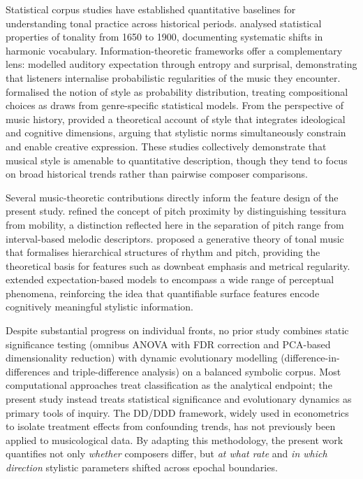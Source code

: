 \documentclass[]{interact}
\theoremstyle{plain}
\theoremstyle{definition}
\theoremstyle{remark}
\begin{document}
Statistical corpus studies have established quantitative baselines for understanding
tonal practice across historical periods. \citet{White2013} analysed statistical
properties of tonality from 1650 to 1900, documenting systematic shifts in harmonic
vocabulary. Information-theoretic frameworks offer a complementary lens:
\citet{PearceWiggins2012} modelled auditory expectation through entropy and
surprisal, demonstrating that listeners internalise probabilistic regularities
of the music they encounter. \citet{Temperley2007} formalised the notion of style
as probability distribution, treating compositional choices as draws from
genre-specific statistical models. From the perspective of music history,
\citet{Meyer1989} provided a theoretical account of style that integrates
ideological and cognitive dimensions, arguing that stylistic norms simultaneously
constrain and enable creative expression. These studies collectively demonstrate
that musical style is amenable to quantitative description, though they tend to
focus on broad historical trends rather than pairwise composer comparisons.

Several music-theoretic contributions directly inform the feature design of the
present study. \citet{VonHippel2000} refined the concept of pitch proximity by
distinguishing tessitura from mobility, a distinction reflected here in the
separation of pitch range from interval-based melodic descriptors.
\citet{LerdahlJackendoff1983} proposed a generative theory of tonal music that
formalises hierarchical structures of rhythm and pitch, providing the theoretical
basis for features such as downbeat emphasis and metrical regularity.
\citet{Huron2006} extended expectation-based models to encompass a wide range
of perceptual phenomena, reinforcing the idea that quantifiable surface features
encode cognitively meaningful stylistic information.

Despite substantial progress on individual fronts, no prior study combines static
significance testing (omnibus ANOVA with FDR correction and PCA-based dimensionality
reduction) with dynamic evolutionary modelling (difference-in-differences and
triple-difference analysis) on a balanced symbolic corpus. Most computational
approaches treat classification as the analytical endpoint; the present study
instead treats statistical significance and evolutionary dynamics as primary tools
of inquiry. The DD/DDD framework, widely used in econometrics to isolate treatment
effects from confounding trends, has not previously been applied to musicological
data. By adapting this methodology, the present work quantifies not only
\emph{whether} composers differ, but \emph{at what rate} and \emph{in which
direction} stylistic parameters shifted across epochal boundaries.
\end{document}

